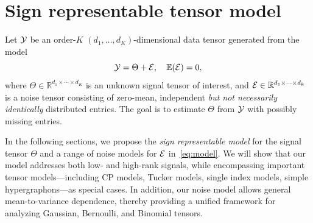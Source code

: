 \documentclass[twoside,11pt]{article}
\theoremstyle{definition}
\begin{document}
\section{Sign representable tensor model}\label{sec:overview}
Let $\mathcal{Y}$ be an order-$K$ $(d_1,\ldots,d_K)$-dimensional data tensor generated from the model
\begin{equation}\label{eq:model}
\mathcal{Y}=\Theta+\mathcal{E}, \quad \mathbb{E}(\mathcal{E})=0,
\end{equation}
where $\Theta\in\mathbb{R}^{d_1\times \cdots \times d_K}$ is an unknown signal tensor of interest, and $\mathcal{E}\in\mathbb{R}^{d_1\times \cdots \times d_k}$ is a noise tensor consisting of zero-mean, independent \emph{but not necessarily identically} distributed entries. The goal is to estimate $\Theta$ from $\mathcal{Y}$ with possibly missing entries. 

In the following sections, we propose the \emph{sign representable model} for the signal tensor $\Theta$ and a range of noise models for $\mathcal{E}$ in~\eqref{eq:model}. We will show that our model addresses both low- and high-rank signals, while encompassing important tensor models---including CP models, Tucker models, single index models, simple hypergraphons---as special cases. In addition, our noise model allows general mean-to-variance dependence, thereby providing a unified framework for analyzing Gaussian, Bernoulli, and Binomial tensors.  %

\end{document}
